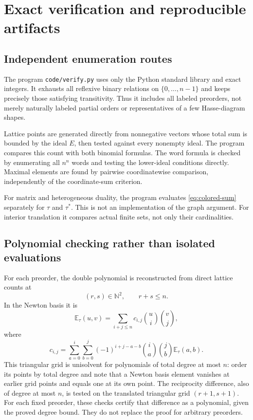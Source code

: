 \documentclass[11pt,letterpaper]{article}
\theoremstyle{definition}
\newcommand{\N}{\mathbb N}
\newcommand{\EE}{\mathbb E}
\begin{document}
\section{Exact verification and reproducible artifacts}\label{sec:verification}

\subsection{Independent enumeration routes}
The program \texttt{code/verify.py} uses only the Python standard library
and exact integers. It exhausts all reflexive binary relations on
$\{0,\ldots,n-1\}$ and keeps precisely those satisfying transitivity.
Thus it includes all labeled preorders, not merely naturally labeled
partial orders or representatives of a few Hasse-diagram shapes.

Lattice points are generated directly from nonnegative vectors whose total
sum is bounded by the ideal $E$, then tested against every nonempty ideal.
The program compares this count with both binomial formulas. The word
formula is checked by enumerating all $n^n$ words and testing the lower-ideal
conditions directly. Maximal elements are found by pairwise coordinatewise
comparison, independently of the coordinate-sum criterion.

For matrix and heterogeneous duality, the program evaluates
\eqref{eq:colored-sum} separately for $\tau$ and $\tau^*$. This is not an
implementation of the graph argument. For interior translation it compares
actual finite sets, not only their cardinalities.

\subsection{Polynomial checking rather than isolated evaluations}
For each preorder, the double polynomial is reconstructed from direct
lattice counts at
\[
 (r,s)\in\N^2,\qquad r+s\leq n.
\]
In the Newton basis it is
\begin{equation}\label{eq:newton}
 \EE_\tau(u,v)=\sum_{i+j\leq n}c_{i,j}\binom ui\binom vj,
\end{equation}
where
\[
 c_{i,j}=\sum_{a=0}^i\sum_{b=0}^j
       (-1)^{i+j-a-b}\binom ia\binom jb\EE_\tau(a,b).
\]
This triangular grid is unisolvent for polynomials of total degree at most
$n$: order its points by total degree and note that a Newton basis element
vanishes at earlier grid points and equals one at its own point. The
reciprocity difference, also of degree at most $n$, is tested on the
translated triangular grid $(r+1,s+1)$. For each fixed preorder, these
checks certify that difference as a polynomial, given the proved degree
bound. They do not replace the proof for arbitrary preorders.
\end{document}
